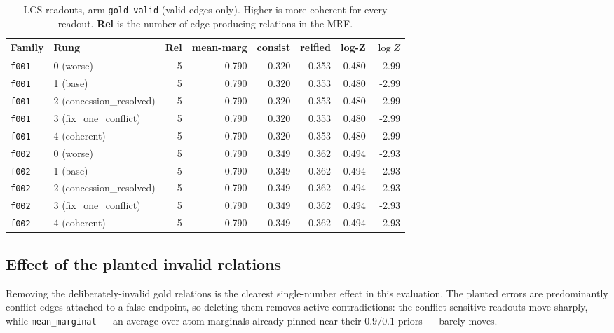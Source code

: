 \documentclass[11pt]{article}
\begin{document}
\begin{table}[htbp]
\centering
\small
\caption{LCS readouts, arm \texttt{gold\_valid} (valid edges only). Higher is more coherent for every readout. \textbf{Rel} is the number of edge-producing relations in the MRF.}
\label{tab:scores-gold-valid}
\begin{tabular}{llrrrrrr}
\toprule
Family & Rung & Rel & \textbf{mean-marg} & \textbf{consist} & \textbf{reified} & \textbf{log-Z} & $\log Z$ \\
\midrule
\texttt{f001} & 0 (worse) & 5 & 0.790 & 0.320 & 0.353 & 0.480 & -2.99 \\
\texttt{f001} & 1 (base) & 5 & 0.790 & 0.320 & 0.353 & 0.480 & -2.99 \\
\texttt{f001} & 2 (concession\_resolved) & 5 & 0.790 & 0.320 & 0.353 & 0.480 & -2.99 \\
\texttt{f001} & 3 (fix\_one\_conflict) & 5 & 0.790 & 0.320 & 0.353 & 0.480 & -2.99 \\
\texttt{f001} & 4 (coherent) & 5 & 0.790 & 0.320 & 0.353 & 0.480 & -2.99 \\
\midrule
\texttt{f002} & 0 (worse) & 5 & 0.790 & 0.349 & 0.362 & 0.494 & -2.93 \\
\texttt{f002} & 1 (base) & 5 & 0.790 & 0.349 & 0.362 & 0.494 & -2.93 \\
\texttt{f002} & 2 (concession\_resolved) & 5 & 0.790 & 0.349 & 0.362 & 0.494 & -2.93 \\
\texttt{f002} & 3 (fix\_one\_conflict) & 5 & 0.790 & 0.349 & 0.362 & 0.494 & -2.93 \\
\texttt{f002} & 4 (coherent) & 5 & 0.790 & 0.349 & 0.362 & 0.494 & -2.93 \\
\bottomrule
\end{tabular}
\end{table}

\subsection{Effect of the planted invalid relations}

Removing the deliberately-invalid gold relations is the clearest single-number effect in this evaluation. The planted errors are predominantly conflict edges attached to a false endpoint, so deleting them removes active contradictions: the conflict-sensitive readouts move sharply, while \texttt{mean\_marginal} --- an average over atom marginals already pinned near their $0.9/0.1$ priors --- barely moves.
\end{document}
